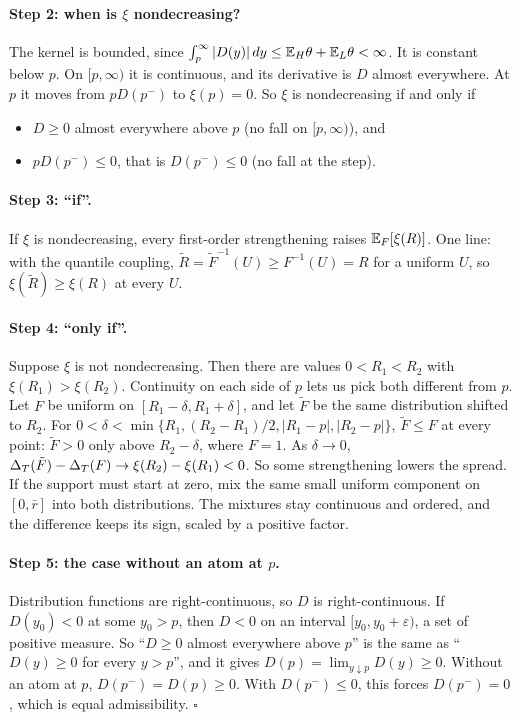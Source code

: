 \paragraph{Step 2: when is \(\xi\) nondecreasing?} The kernel is bounded, since
\(\int_p^\infty|D(y)|\,dy\le\mathbb{E}_H\theta+\mathbb{E}_L\theta<\infty\). It is constant below \(p\). On \([p,\infty)\) it
is continuous, and its derivative is \(D\) almost everywhere. At \(p\) it moves from \(pD(p^-)\) to
\(\xi(p)=0\). So \(\xi\) is nondecreasing if and only if
\begin{itemize}
\item \(D\ge0\) almost everywhere above \(p\) (no fall on \([p,\infty)\)), and
\item \(pD(p^-)\le0\), that is \(D(p^-)\le0\) (no fall at the step).
\end{itemize}

\paragraph{Step 3: ``if''.} If \(\xi\) is nondecreasing, every first-order strengthening raises
\(\mathbb{E}_F[\xi(R)]\). One line: with the quantile coupling, \(\tilde R=\tilde F^{-1}(U)\ge F^{-1}(U)=R\) for a
uniform \(U\), so \(\xi(\tilde R)\ge\xi(R)\) at every \(U\).

\paragraph{Step 4: ``only if''.} Suppose \(\xi\) is not nondecreasing. Then there are values
\(0<R_1<R_2\) with \(\xi(R_1)>\xi(R_2)\). Continuity on each side of \(p\) lets us pick both different from
\(p\). Let \(F\) be uniform on \([R_1-\delta,R_1+\delta]\), and let \(\tilde F\) be the same distribution shifted
to \(R_2\). For \(0<\delta<\min\{R_1,(R_2-R_1)/2,|R_1-p|,|R_2-p|\}\), \(\tilde F\le F\) at every point: \(\tilde F>0\) only above
\(R_2-\delta\), where \(F=1\). As \(\delta\to0\), \(\Delta_T(\tilde F)-\Delta_T(F)\to\xi(R_2)-\xi(R_1)<0\). So some
strengthening lowers the spread. If the support must start at zero, mix the same small uniform component
on \([0,\bar r]\) into both distributions. The mixtures stay continuous and ordered, and the difference keeps its
sign, scaled by a positive factor.

\paragraph{Step 5: the case without an atom at \(p\).} Distribution functions are right-continuous, so
\(D\) is right-continuous. If \(D(y_0)<0\) at some \(y_0>p\), then \(D<0\) on an interval
\([y_0,y_0+\varepsilon)\), a set of positive measure. So ``\(D\ge0\) almost everywhere above \(p\)'' is the
same as ``\(D(y)\ge0\) for every \(y>p\)'', and it gives \(D(p)=\lim_{y\downarrow p}D(y)\ge0\). Without
an atom at \(p\), \(D(p^-)=D(p)\ge0\). With \(D(p^-)\le0\), this forces \(D(p^-)=0\), which is equal
admissibility. \hfill\(\square\)

